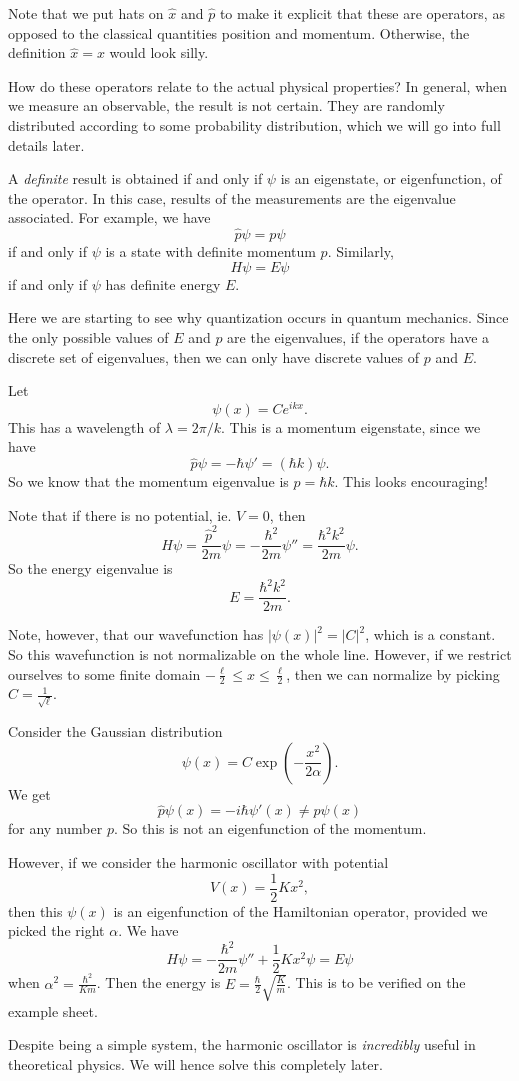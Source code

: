\documentclass[a4paper]{article}
\begin{document}
Note that we put hats on $\hat{x}$ and $\hat{p}$ to make it explicit that these are operators, as opposed to the classical quantities position and momentum. Otherwise, the definition $\hat{x} = x$ would look silly.

How do these operators relate to the actual physical properties? In general, when we measure an observable, the result is not certain. They are randomly distributed according to some probability distribution, which we will go into full details later.

A \emph{definite} result is obtained if and only if $\psi$ is an eigenstate, or eigenfunction, of the operator. In this case, results of the measurements are the eigenvalue associated. For example, we have
\[
  \hat{p} \psi = p\psi
\]
if and only if $\psi$ is a state with definite momentum $p$. Similarly,
\[
  H\psi = E\psi
\]
if and only if $\psi$ has definite energy $E$.

Here we are starting to see why quantization occurs in quantum mechanics. Since the only possible values of $E$ and $p$ are the eigenvalues, if the operators have a discrete set of eigenvalues, then we can only have discrete values of $p$ and $E$.

\begin{eg}
  Let
  \[
    \psi(x) = Ce^{ikx}.
  \]
  This has a wavelength of $\lambda = 2\pi/k$. This is a momentum eigenstate, since we have
  \[
    \hat{p}\psi = -\hbar \psi' = (\hbar k)\psi.
  \]
  So we know that the momentum eigenvalue is $p = \hbar k$. This looks encouraging!

  Note that if there is no potential, ie. $V = 0$, then
  \[
    H\psi = \frac{\hat{p}^2}{2m}\psi = -\frac{\hbar^2}{2m}\psi'' = \frac{\hbar^2 k^2}{2m}\psi.
  \]
  So the energy eigenvalue is
  \[
    E = \frac{\hbar^2 k^2}{2m}.
  \]
\end{eg}
Note, however, that our wavefunction has $|\psi(x)|^2 = |C|^2$, which is a constant. So this wavefunction is not normalizable on the whole line. However, if we restrict ourselves to some finite domain $-\frac{\ell}{2} \leq x \leq \frac{\ell}{2}$, then we can normalize by picking $C= \frac{1}{\sqrt{\ell}}$.

\begin{eg}
  Consider the Gaussian distribution
  \[
    \psi(x) = C\exp\left(-\frac{x^2}{2\alpha}\right).
  \]
  We get
  \[
    \hat{p}\psi(x) = -i\hbar \psi'(x) \not= p\psi(x)
  \]
  for any number $p$. So this is not an eigenfunction of the momentum.

  However, if we consider the harmonic oscillator with potential
  \[
    V(x) = \frac{1}{2}Kx^2,
  \]
  then this $\psi(x)$ is an eigenfunction of the Hamiltonian operator, provided we picked the right $\alpha$. We have
  \[
    H\psi = -\frac{\hbar^2}{2m}\psi'' + \frac{1}{2}Kx^2 \psi = E\psi
  \]
  when $\alpha^2 = \frac{\hbar^2}{Km}$. Then the energy is $E = \frac{\hbar}{2}\sqrt{\frac{K}{m}}$. This is to be verified on the example sheet.
\end{eg}
Despite being a simple system, the harmonic oscillator is \emph{incredibly} useful in theoretical physics. We will hence solve this completely later.
\end{document}
